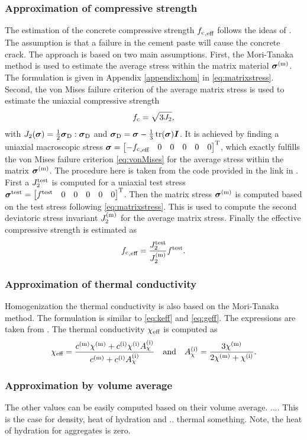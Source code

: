 \subsubsection{Approximation of compressive strength}
The estimation of the concrete compressive strength ${f_{\text{c}}}_{,\text{eff}}$ follows the ideas of \cite{nev_2018_mcam}.
The assumption is that a failure in the cement paste will cause the concrete crack.
The approach is based on two main assumptions.
First, the Mori-Tanaka method is used to estimate the average stress within the matrix material $\boldsymbol{\sigma}^{(\text{m})}$. 
The formulation is given in Appendix \ref{appendix:hom} in \eqref{eq:matrixstress}.
Second, the von Mises failure criterion of the average matrix stress is used to estimate the uniaxial compressive strength
\begin{align}
{f_{\text{c}}} = \sqrt{3 J_2},  \label{eq:vonMises}
\end{align}
with $J_2(\boldsymbol{\sigma}) = \frac{1}{2} \boldsymbol{\sigma}_{\text{D}}:\boldsymbol{\sigma}_{\text{D}}$ and $\boldsymbol{\sigma}_{\text{D}} = \boldsymbol{\sigma} - \frac{1}{3}\operatorname{tr}(\boldsymbol{\sigma})\boldsymbol{I}$.
It is achieved by finding a uniaxial macroscopic stress $\boldsymbol{\sigma} = \begin{bmatrix} -{f_{\text{c}}}_{,\text{eff}} & 0 & 0 &0&0&0 \end{bmatrix}^\text{T}$, which exactly fulfills the von Mises failure criterion \eqref{eq:vonMises} for the average stress within the matrix $\boldsymbol{\sigma}^{(\text{m})}$.
The procedure here is taken from the code provided in the link in \cite{nee_2012_ammf}.
First a $J_2^{\text{test}}$ is computed for a uniaxial test stress $\boldsymbol{\sigma}^{\text{test}} = \begin{bmatrix} f^{\text{test}} & 0 & 0 &0&0&0 \end{bmatrix}^\text{T}$. 
Then the matrix stress $\boldsymbol{\sigma}^{(\text{m})}$ is computed based on the test stress following \eqref{eq:matrixstress}. 
This is used to compute the second deviatoric stress invariant $J_2^{(\text{m})}$ for the average matrix stress.
Finally the effective compressive strength is estimated as
\begin{align}
	{f_{\text{c}}}_{,\text{eff}} = \frac{J_2^{\text{test}}}{J_2^{(\text{m})}} f^{\text{test}}.
\end{align}
\subsubsection{Approximation of thermal conductivity }
Homogenization the thermal conductivity is also based on the Mori-Tanaka method.
The formulation is similar to \eqref{eq:keff} and \eqref{eq:geff}.
The expressions are taken from \cite{str_2011_mbeo}.
The thermal conductivity $\chi_{\text{eff}}$ is computed as
\begin{align}
	\chi_{\text{eff}} = \dfrac{c^{(\text{m})}\chi^{(\text{m})} + c^{(\text{i})} \chi^{(\text{i})} A_{\chi}^{(\text{i})}}{c^{(\text{m})} +  c^{(\text{i})} A_{\chi}^{(\text{i})}}\quad\text{and}\quad
	A_{\chi}^{(\text{i})} = \frac{3\chi^{(\text{m})}}{2\chi^{(\text{m})}+\chi^{(\text{i})}}.
\end{align}
\subsubsection{Approximation by volume average}
The other values can be easily computed based on their volume average.
....
This is the case for density, heat of hydration and .. thermal something.
Note, the heat of hydration for aggregates is zero.

